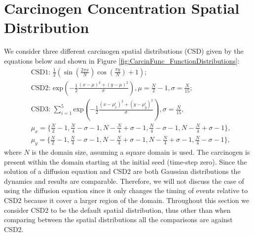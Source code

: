 \documentclass[\main/thesis.tex]{subfiles}
\begin{document}
\section{Carcinogen Concentration Spatial Distribution}
We consider three different carcinogen spatial distributions (CSD) given by the equations below and shown in Figure \ref{fig:CarcinFunc_FunctionDistributions}:
\begin{align}
    &\text{CSD1: } \frac{1}{2} \left ( \sin\left(\frac{2\pi x}{N}\right) \cos\left(\frac{\pi y}{N}\right) + 1 \right ); \label{eq:CarcinFunc1}\\
    &\text{CSD2: } \text{exp} \left ( -\frac{1}{2} \frac{(x - \mu)^2 + (y - \mu)^2}{\sigma} \right ), \mu = \frac{N}{2} - 1, \sigma = \frac{N}{15}; \label{eq:CarcinFunc2}\\
    &\text{CSD3: } \sum_{i{=}1}^{5} \text{exp} \left ( -\frac{1}{2} \frac{(x - \mu_x^i)^2 + (y - \mu_y^i)^2}{\sigma} \right ), \sigma = \frac{N}{15}, \label{eq:CarcinFunc3}\\
&\mu_x = \{ \frac{N}{2} {-} 1, \frac{N}{4} {-} \sigma {-} 1, N {-} \frac{N}{4} {+} \sigma {-} 1, \frac{N}{4} {-} \sigma {-} 1, N {-} \frac{N}{4} {+} \sigma {-} 1 \}, \nonumber \\
&\mu_y = \{ \frac{N}{2} {-} 1, \frac{N}{4} {-} \sigma {-} 1, N {-} \frac{N}{4} {+} \sigma {-} 1, N {-} \frac{N}{4} {+} \sigma {-} 1, \frac{N}{4} {-} \sigma {-} 1 \}, \nonumber
\end{align}
where $N$ is the domain size, assuming a square domain is used. The carcinogen is present within the domain starting at the initial seed (time-step zero). Since the solution of a diffusion equation and CSD2 are both Gaussian distributions the dynamics and results are comparable. Therefore, we will not discuss the case of using the diffusion equation since it only changes the timing of events relative to CSD2 because it cover a larger region of the domain. Throughout this section we consider CSD2 to be the default spatial distribution, thus other than when comparing between the spatial distributions all the comparisons are against CSD2. 
\end{document}
